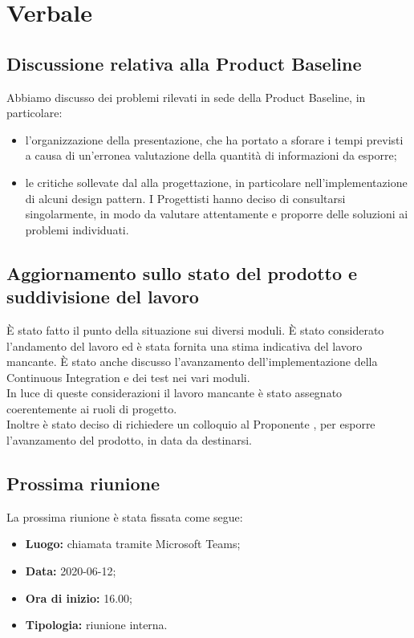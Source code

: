 \section{Verbale}
\subsection{Discussione relativa alla Product Baseline}
	Abbiamo discusso dei problemi rilevati in sede della Product Baseline, in particolare:
	\begin{itemize}
		\item l'organizzazione della presentazione, che ha portato a sforare i tempi previsti a causa di un'erronea valutazione della quantità di informazioni da esporre;
		\item le critiche sollevate dal \RC{} alla progettazione, in particolare nell'implementazione di alcuni design pattern. I Progettisti hanno deciso di consultarsi singolarmente, in modo da valutare attentamente e proporre delle soluzioni ai problemi individuati.
	\end{itemize}
\subsection{Aggiornamento sullo stato del prodotto e suddivisione del lavoro}
È stato fatto il punto della situazione sui diversi moduli. È stato considerato l’andamento del lavoro ed è stata fornita una stima indicativa del lavoro mancante. È stato anche discusso l'avanzamento dell'implementazione della Continuous Integration e dei test nei vari moduli.\\ In luce di queste considerazioni il lavoro mancante è stato assegnato coerentemente ai ruoli di progetto.\\ Inoltre è stato deciso di richiedere un colloquio al Proponente \Proponente{}, per esporre l'avanzamento del prodotto, in data da destinarsi.
	\subsection{Prossima riunione}
		La prossima riunione è stata fissata come segue:
		\begin{itemize}
			\item \textbf{Luogo:} chiamata tramite Microsoft Teams;
			\item \textbf{Data:} 2020-06-12;
			\item \textbf{Ora di inizio:} 16.00;
			\item \textbf{Tipologia:} riunione interna.
		\end{itemize}

